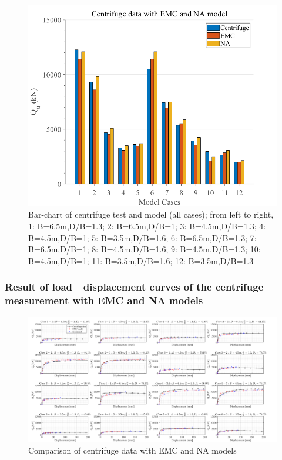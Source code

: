 \documentclass[a4paper, nobind]{templates/ociamthesis}
\begin{document}
\begin{figure}[H]
\includegraphics[width=1\linewidth]{myfigureeeeee/barchart1} \caption{Bar-chart of centrifuge test and model (all cases); from left to right, 1: B=6.5m,D/B=1.3; 2: B=6.5m,D/B=1; 3: B=4.5m,D/B=1.3; 4: B=4.5m,D/B=1; 5: B=3.5m,D/B=1.6; 6: B=6.5m,D/B=1.3; 7: B=6.5m,D/B=1; 8: B=4.5m,D/B=1.6; 9: B=4.5m,D/B=1.3; 10: B=4.5m,D/B=1; 11: B=3.5m,D/B=1.6; 12: B=3.5m,D/B=1.3}\label{fig:unnamed-chunk-47}
\end{figure}

\begin{landscape}

\hypertarget{result-of-loaddisplacement-curves-of-the-centrifuge-measurement-with-emc-and-na-models}{%
\subsubsection{Result of load---displacement curves of the centrifuge measurement with EMC and NA models}\label{result-of-loaddisplacement-curves-of-the-centrifuge-measurement-with-emc-and-na-models}}

\begin{figure}[H]

{\centering \includegraphics[width=1\linewidth]{myfigureeeeee/Comparison_of_centrifuge_data_with_EMC_and_NA_models} 

}

\caption{Comparison of centrifuge data with EMC and NA models}\label{fig:unnamed-chunk-48}
\end{figure}

\end{landscape}
\end{document}

